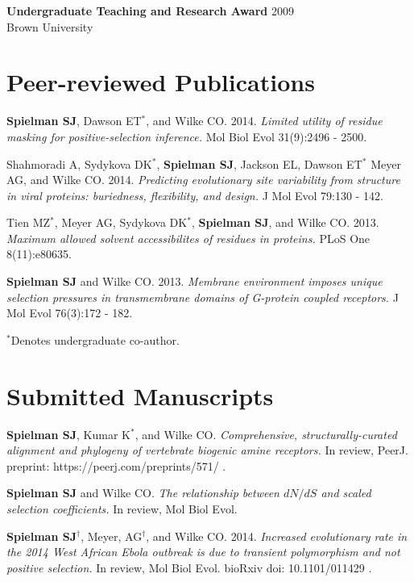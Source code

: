 \documentclass[line, margin]{res}
\begin{document}
\begin{resume}
\textbf{Undergraduate Teaching and Research Award} \hfill 2009 \\ Brown University

\vspace{0.75cm}
		



\vspace{0.75cm}

\section{Peer-reviewed Publications}

\textbf{Spielman SJ}, Dawson ET$^\ast$, and Wilke CO. 2014. \emph{Limited utility of residue masking for positive-selection inference.} Mol Biol Evol 31(9):2496 - 2500.

Shahmoradi A, Sydykova DK$^\ast$, \textbf{Spielman SJ}, Jackson EL, Dawson ET$^\ast$ Meyer AG, and Wilke CO. 2014. \emph{Predicting evolutionary site variability from structure in viral proteins: buriedness, flexibility, and design.} J Mol Evol 79:130 - 142.

Tien MZ$^\ast$, Meyer AG, Sydykova DK$^\ast$, \textbf{Spielman SJ}, and Wilke CO. 2013. \emph{Maximum allowed solvent accessibilites of residues in proteins.} PLoS One 8(11):e80635.


\textbf{Spielman SJ} and Wilke CO. 2013. \emph{Membrane environment imposes unique selection pressures in transmembrane domains of G-protein coupled receptors.} J Mol Evol 76(3):172 - 182.


$^\ast$Denotes undergraduate co-author.

\vspace{0.75cm}


\section{Submitted Manuscripts}

\textbf{Spielman SJ}, Kumar K$^\ast$, and Wilke CO. \emph{Comprehensive, structurally-curated alignment and phylogeny of vertebrate biogenic amine receptors.} In review, PeerJ. preprint: https://peerj.com/preprints/571/ .


\textbf{Spielman SJ} and Wilke CO. \emph{The relationship between $dN/dS$ and scaled selection coefficients.}  In review, Mol Biol Evol.


\textbf{Spielman SJ}$^\dagger$, Meyer, AG$^\dagger$, and Wilke CO. 2014. \emph{Increased evolutionary rate in the 2014 West African Ebola outbreak is due to transient polymorphism and not positive selection.} In review, Mol Biol Evol. bioRxiv doi: 10.1101/011429 .
 

\end{resume}
\end{document}
